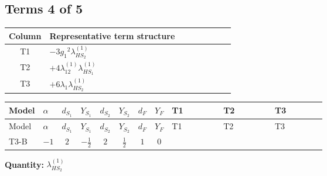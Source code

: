 \documentclass[8pt]{article}
\begin{document}
\begin{landscape}
\subsection*{Terms 4 of 5}
\begin{center}
\begin{tabular}{@{}c >{\raggedright\arraybackslash}p{0.82\linewidth}@{}}
\toprule
Column & Representative term structure \\
\midrule
T1 & \(\displaystyle -3 {g_1}^2 {\lambda_{HS_2}^{(1)}}\) \\
\midrule
T2 & \(\displaystyle +4 {\lambda_{12}^{(1)}} {\lambda_{HS_1}^{(1)}}\) \\
\midrule
T3 & \(\displaystyle +6 {\lambda_1} {\lambda_{HS_2}^{(1)}}\) \\
\midrule
\bottomrule
\end{tabular}
\end{center}
\smallskip
\tiny
\begin{longtable}{@{}llcccccc >{\raggedright\arraybackslash}p{0.21\linewidth} >{\raggedright\arraybackslash}p{0.21\linewidth} >{\raggedright\arraybackslash}p{0.21\linewidth}@{}}
\toprule
Model & $\alpha$ & $d_{S_1}$ & $Y_{S_1}$ & $d_{S_2}$ & $Y_{S_2}$ & $d_F$ & $Y_F$ & T1 & T2 & T3 \\
\midrule
\endfirsthead
\toprule
Model & $\alpha$ & $d_{S_1}$ & $Y_{S_1}$ & $d_{S_2}$ & $Y_{S_2}$ & $d_F$ & $Y_F$ & T1 & T2 & T3 \\
\midrule
\endhead
T3-B & $-1$ & $2$ & $-\frac{1}{2}$ & $2$ & $\frac{1}{2}$ & $1$ & $0$ & \scriptsize\adjustbox{max width=\linewidth}{$\begin{gathered} -3 {g_1}^2 {\lambda_{HS_2}^{(1)}}\end{gathered}$} & \scriptsize\adjustbox{max width=\linewidth}{$\begin{gathered} +4 {\lambda_{12}^{(1)}} {\lambda_{HS_1}^{(1)}}\end{gathered}$} & \scriptsize\adjustbox{max width=\linewidth}{$\begin{gathered} +6 {\lambda_1} {\lambda_{HS_2}^{(1)}}\end{gathered}$} \\
\midrule
\bottomrule
\end{longtable}
\clearpage
\noindent\textbf{Quantity: }$\lambda_{HS_2}^{(1)}$\par\smallskip

\end{landscape}
\end{document}
